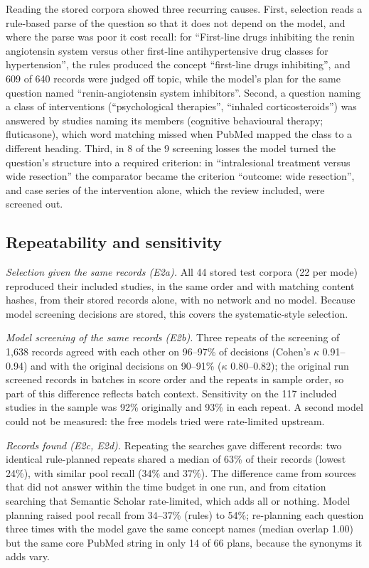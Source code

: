 Reading the stored corpora showed three recurring causes. First, selection reads a rule-based parse of the
question so that it does not depend on the model, and where the parse was poor it cost recall: for ``First-line
drugs inhibiting the renin angiotensin system versus other first-line antihypertensive drug classes for
hypertension'', the rules produced the concept ``first-line drugs inhibiting'', and 609 of 640 records were judged
off topic, while the model's plan for the same question named ``renin-angiotensin system inhibitors''. Second, a
question naming a class of interventions (``psychological therapies'', ``inhaled corticosteroids'') was answered by
studies naming its members (cognitive behavioural therapy; fluticasone), which word matching missed when PubMed
mapped the class to a different heading. Third, in 8 of the 9 screening losses the model turned the question's
structure into a required criterion: in ``intralesional treatment versus wide resection'' the comparator became the
criterion ``outcome: wide resection'', and case series of the intervention alone, which the review included, were
screened out.

\subsection{Repeatability and sensitivity}

\emph{Selection given the same records (E2a).} All 44 stored test corpora (22 per mode) reproduced their included
studies, in the same order and with matching content hashes, from their stored records alone, with no network and
no model. Because model screening decisions are stored, this covers the systematic-style selection.

\emph{Model screening of the same records (E2b).} Three repeats of the screening of 1,638 records agreed with each
other on 96--97\% of decisions (Cohen's $\kappa$ 0.91--0.94) and with the original decisions on 90--91\% ($\kappa$
0.80--0.82); the original run screened records in batches in score order and the repeats in sample order, so part
of this difference reflects batch context. Sensitivity on the 117 included studies in the sample was 92\% originally
and 93\% in each repeat. A second model could not be measured: the free models tried were rate-limited upstream.

\emph{Records found (E2c, E2d).} Repeating the searches gave different records: two identical rule-planned repeats
shared a median of 63\% of their records (lowest 24\%), with similar pool recall (34\% and 37\%). The difference came
from sources that did not answer within the time budget in one run, and from citation searching that Semantic
Scholar rate-limited, which adds all or nothing. Model planning raised pool recall from 34--37\% (rules) to 54\%;
re-planning each question three times with the model gave the same concept names (median overlap 1.00) but the
same core PubMed string in only 14 of 66 plans, because the synonyms it adds vary.

